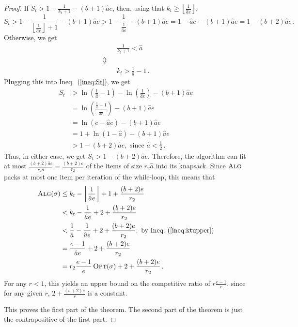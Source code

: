 \documentclass[a4paper,UKenglish,cleveref, autoref, thm-restate]{lipics-v2021}
\newcommand{\ALG}{\ensuremath{\operatorname{\textsc{Alg}}}\xspace}
\newcommand{\OPT}{\ensuremath{\operatorname{\textsc{Opt}}}\xspace}
\newcommand{\FLOOR}[1]{\left\lfloor#1\right\rfloor}
\newcommand{\guess}{\ensuremath{\hat{a}}\xspace}
\newcommand{\kfinal}{\ensuremath{k_t}\xspace}
\begin{document}
\begin{proof}
If $S_t > 1-\frac{1}{\kfinal+1} - (b+1)\guess e$, then,
using that $k_t\geq \FLOOR{\frac{1}{\guess e}}$,
$$S_t >  1-\frac{1}{ \FLOOR{\frac{1}{\guess e}}+1} - (b+1)\guess e >  1-\frac{1}{\frac{1}{\guess e}} - (b+1)\guess e =  1-\guess e - (b+1)\guess e = 1 - (b+2)\guess e\,.$$
Otherwise, we get
\begin{align}
& \frac{1}{\kfinal+1} < \guess\nonumber\\
  \Updownarrow~~~\nonumber\\
& \kfinal > \frac{1}{\guess}-1 \,.
\end{align}
Plugging this into Ineq.~(\ref{ineq:St}), we get
\begin{align*}
  S_t & > \ln\left(\frac{1}{\guess}-1\right) -
  \ln\left(\frac{1}{\guess e} \right) - (b+1)\guess e\\
  & = \ln\left(\frac{\frac{1}{\guess}-1}{\frac{1}{\guess e}} \right)
  - (b+1)\guess e\\
  & = \ln\left(e-\guess e \right) - (b+1)\guess e\\
  & = 1 + \ln(1-\guess) -(b+1)\guess e \\
  & > 1-(b+2)\guess e, \text{ since } \guess < \frac12 \,.
\end{align*}
Thus, in either case, we get
$S_t > 1-(b+2)\guess e$.
Therefore, the algorithm can fit at most $\frac{(b+2)\guess e}{r_2
  \guess} = \frac{(b+2)e}{r_2}$ of the items of size $r_2 \guess$ into
its knapsack.
Since \ALG packs at most one item per iteration of the while-loop,
this means that
\begin{align*}
\ALG(\sigma)
  & \leq \kfinal - \FLOOR{\frac{1}{\guess e}} + 1 +
    \frac{(b+2)e}{r_2} \\
  & < \kfinal - \frac{1}{\guess e} + 2 + \frac{(b+2)e}{r_2} \\
  & < \frac{1}{\guess} - \frac{1}{\guess e} + 2 +
    \frac{(b+2)e}{r_2}, \text{ by Ineq.~(\ref{ineq:ktupper})} \\
  & = \frac{e-1}{\guess e} + 2 + \frac{(b+2)e}{r_2}\\
  & = r_2 \frac{e-1}{e}\OPT(\sigma) + 2 + \frac{(b+2)e}{r_2} \,.
\end{align*}
For any $r < 1$, this yields an upper bound on the competitive ratio
of $r \frac{e-1}{e}$, since for any given $r$, $ 2 + \frac{(b+2)e}{r}$
is a constant.  

This proves the first part of the theorem.
The second part of the theorem is just the contrapositive of the first part.
\end{proof}
\end{document}
